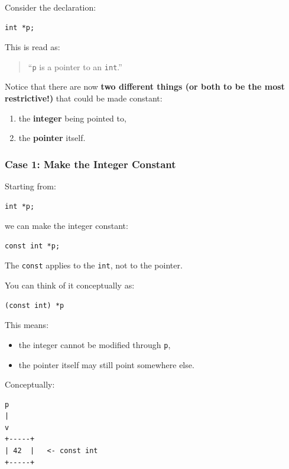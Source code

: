 \documentclass[10pt]{article}
\begin{document}
Consider the declaration:

\begin{verbatim}
int *p;
\end{verbatim}

This is read as:

\begin{quote}
``\verb|p| is a pointer to an \verb|int|.''
\end{quote}

Notice that there are now \textbf{two different things (or both to be the most restrictive!)} that could be made constant:

\begin{enumerate}
    \item the \textbf{integer} being pointed to,
    \item the \textbf{pointer} itself.
\end{enumerate}

\subsubsection*{Case 1: Make the Integer Constant}

Starting from:

\begin{verbatim}
int *p;
\end{verbatim}

we can make the integer constant:

\begin{verbatim}
const int *p;
\end{verbatim}

The \verb|const| applies to the \verb|int|, not to the pointer.

You can think of it conceptually as:

\begin{verbatim}
(const int) *p
\end{verbatim}

This means:

\begin{itemize}
    \item the integer cannot be modified through \verb|p|,
    \item the pointer itself may still point somewhere else.
\end{itemize}

Conceptually:

\begin{verbatim}
p
|
v
+-----+
| 42  |   <- const int
+-----+
\end{verbatim}
\end{document}
